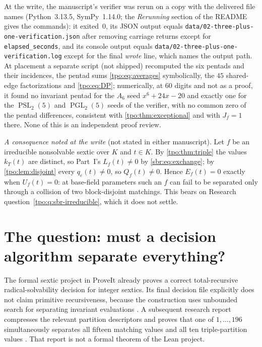 \documentclass[11pt,letterpaper]{article}
\numberwithin{equation}{section}
\theoremstyle{definition}
\theoremstyle{remark}
\newcommand{\src}[1]{\texttt{\nolinkurl{#1}}}
\begin{document}
At the write, the manuscript's verifier was rerun on a copy with the
delivered file names (Python~3.13.5, SymPy~1.14.0; the \emph{Rerunning} section of
the README gives the commands): it exited~0, its JSON output equals
\src{data/02-three-plus-one-verification.json} after removing carriage
returns except for \src{elapsed_seconds}, and its console output equals
\src{data/02-three-plus-one-verification.log} except for the final
\emph{wrote} line, which names the output path. At placement a separate
script (not shipped) recomputed the six pentads and their incidences, the
pentad sums \eqref{tpo:eq:averages} symbolically, the $45$ shared-edge
factorizations and \eqref{tpo:eq:DP}; numerically, at 60 digits and not as
a proof, it found no invariant pentad for the $A_6$ seed $x^6+24x-20$ and
exactly one for the $\operatorname{PSL}_2(5)$ and $\operatorname{PGL}_2(5)$
seeds of the verifier, with no common zero of the pentad differences,
consistent with \cref{tpo:thm:exceptional} and with $J_f=1$ there. None of
this is an independent proof review.

\emph{A consequence noted at the write} (not stated in either manuscript).
Let $f$ be an irreducible nonsolvable sextic over $K$ and $t\in K$. By
\cref{tpo:thm:triple} the values $k_T(t)$ are distinct, so Part~I's
$L_f(t)\ne0$ by \eqref{sbr:eq:exchange}; by \cref{tpo:lem:disjoint}
every $q_e(t)\ne0$, so $Q_f(t)\ne0$. Hence $E_f(t)=0$ exactly when
$U_f(t)=0$: at base-field parameters such an $f$ can fail to be separated
only through a collision of two block-disjoint matchings. This bears on
Research question~\ref{tpo:q:sbr-irreducible}, which it does not settle.

\section{The question: must a decision algorithm separate everything?}
\label{tpo:sec:scope}

The formal sextic project in ProveIt already proves a correct total-recursive
radical-solvability decision for integer sextics. Its final decision file
explicitly does not claim primitive recursiveness, because the construction
uses unbounded search for separating invariant evaluations
\cite{repo-decision}. A subsequent research report compresses the relevant
partition descriptors and proves that one of $1,\ldots,196$ simultaneously
separates all fifteen matching values and all ten triple-partition values
\cite{tpo:separators}. That report is not a formal theorem of the Lean project.
\end{document}
